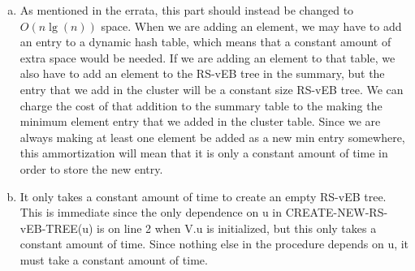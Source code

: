 \documentclass{article}
\begin{document}
\begin{enumerate}[a.]
\item
As mentioned in the errata, this part should instead be changed to $O(n\lg(n))$ space. When we are adding an element, we may have to add an entry to a dynamic hash table, which means that a constant amount of extra space would be needed. If we are adding an element to that table, we also have to add an element to the RS-vEB tree in the summary, but the entry that we add in the cluster will be a constant size RS-vEB tree. We can charge the cost of that addition to the summary table to the making the minimum element entry that we added in the cluster table. Since we are always making at least one element be added as a new min entry somewhere, this ammortization will mean that it is only a constant amount of time in order to store the new entry.

\item
It only takes a constant amount of time to create an empty RS-vEB tree. This is immediate since the only dependence on u in CREATE-NEW-RS-vEB-TREE(u) is on line 2 when V.u is initialized, but this only takes a constant amount of time. Since nothing else in the procedure depends on u, it must take a constant amount of time.
\end{enumerate}
\end{document}
